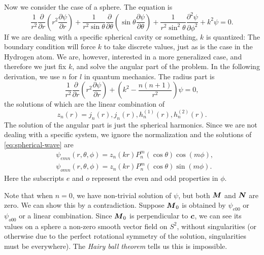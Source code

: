 \documentclass[hyperref, a4paper]{article}
\begin{document}
Now we consider the case of a sphere. The equation is 
\begin{equation}
    \frac{1}{r^{2}} \frac{\partial}{\partial r}\left(r^{2} \frac{\partial \psi}{\partial r}\right)+\frac{1}{r^{2} \sin \theta} \frac{\partial}{\partial \theta}\left(\sin \theta \frac{\partial \psi}{\partial \theta}\right)+\frac{1}{r^{2} \sin ^{2} \theta} \frac{\partial^{2} \psi}{\partial \phi^{2}}+k^{2} \psi=0.
    \label{eq:spherical-wave}
\end{equation}
If we are dealing with a specific spherical cavity or something, $k$ is quantized: The boundary condition 
will force $k$ to take discrete values, just as is the case in the Hydrogen atom. We are, however, interested 
in a more generalized case, and therefore we just fix $k$, and solve the angular part of the problem.
In the following derivation, we use $n$ for $l$ in quantum mechanics. The radius part is 
\begin{equation}
    \frac{1}{r^{2}} \frac{\partial}{\partial r}\left(r^{2} \frac{\partial \psi}{\partial r}\right) + \left( k^2 - \frac{n(n+1)}{r^2} \right) \psi = 0,
\end{equation}
the solutions of which are the linear combination of 
\begin{equation}
    z_n(r) = j_n(r), j_n(r), h^{(1)}_n(r), h^{(2)}_n(r).
\end{equation}
The solution of the angular part is just the spherical harmonics. Since we are not dealing with a 
specific system, we ignore the normalization and the solutions of \eqref{eq:spherical-wave} are 
\begin{equation}
    \begin{aligned}
        &\psi_{e m n}(r, \theta, \phi)=z_{n}(k r) P_{n}^{m}(\cos \theta) \cos (m \phi), \\
        &\psi_{o m n}(r, \theta, \phi)=z_{n}(k r) P_{n}^{m}(\cos \theta) \sin (m \phi).
        \end{aligned}
\end{equation}
Here the subscripts $e$ and $o$ represent the even and odd properties in $\phi$.

Note that when $n=0$, we have non-trivial solution of $\psi$, but both $\vb*{M}$ and $\vb*{N}$ are zero.
We can show this by a contradiction. Suppose $\vb*{M}_0$ is obtained by $\psi_{e00}$ or $\psi_{o00}$ or a linear combination.
Since $\vb*{M}_0$ is perpendicular to $\vb*{c}$, we can see its values on a sphere a non-zero smooth 
vector field on $S^2$, without singularities (or otherwise due to the perfect rotational symmetry of 
the solution, singularities must be everywhere). The \emph{Hairy ball theorem} tells us this is impossible. 
\end{document}
